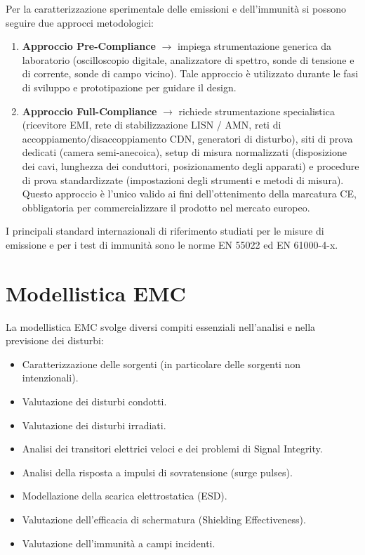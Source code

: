 Per la caratterizzazione sperimentale delle emissioni e dell'immunità si possono seguire due approcci metodologici:
\begin{enumerate}
	\item \textbf{Approccio Pre-Compliance} $\rightarrow$ impiega strumentazione generica da laboratorio (oscilloscopio digitale, analizzatore di spettro, sonde di tensione e di corrente, sonde di campo vicino). Tale approccio è utilizzato durante le fasi di sviluppo e prototipazione per guidare il design.
	\item \textbf{Approccio Full-Compliance} $\rightarrow$ richiede strumentazione specialistica (ricevitore EMI, rete di stabilizzazione LISN / AMN, reti di accoppiamento/disaccoppiamento CDN, generatori di disturbo), siti di prova dedicati (camera semi-anecoica), setup di misura normalizzati (disposizione dei cavi, lunghezza dei conduttori, posizionamento degli apparati) e procedure di prova standardizzate (impostazioni degli strumenti e metodi di misura). Questo approccio è l'unico valido ai fini dell'ottenimento della marcatura CE, obbligatoria per commercializzare il prodotto nel mercato europeo.
\end{enumerate}

I principali standard internazionali di riferimento studiati per le misure di emissione e per i test di immunità sono le norme EN 55022 ed EN 61000-4-x.

\section{Modellistica EMC}
La modellistica EMC svolge diversi compiti essenziali nell'analisi e nella previsione dei disturbi:
\begin{itemize}
	\item Caratterizzazione delle sorgenti (in particolare delle sorgenti non intenzionali).
	\item Valutazione dei disturbi condotti.
	\item Valutazione dei disturbi irradiati.
	\item Analisi dei transitori elettrici veloci e dei problemi di Signal Integrity.
	\item Analisi della risposta a impulsi di sovratensione (surge pulses).
	\item Modellazione della scarica elettrostatica (ESD).
	\item Valutazione dell'efficacia di schermatura (Shielding Effectiveness).
	\item Valutazione dell'immunità a campi incidenti.
\end{itemize}

